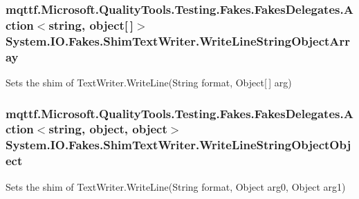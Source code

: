 \hypertarget{class_system_1_1_i_o_1_1_fakes_1_1_shim_text_writer_a5f06e2dba329e4cbc3cd29fa46e3e5e4}{
\subsubsection[{Write\-Line\-String\-Object\-Array}]{\setlength{\rightskip}{0pt plus 5cm}mqttf.\-Microsoft.\-Quality\-Tools.\-Testing.\-Fakes.\-Fakes\-Delegates.\-Action$<$string, object\mbox{[}$\,$\mbox{]}$>$ System.\-I\-O.\-Fakes.\-Shim\-Text\-Writer.\-Write\-Line\-String\-Object\-Array\hspace{0.3cm}{\ttfamily [set]}}}\label{class_system_1_1_i_o_1_1_fakes_1_1_shim_text_writer_a5f06e2dba329e4cbc3cd29fa46e3e5e4}


Sets the shim of Text\-Writer.\-Write\-Line(\-String format, Object\mbox{[}$\,$\mbox{]} arg)

\hypertarget{class_system_1_1_i_o_1_1_fakes_1_1_shim_text_writer_a6feb51fb3a382882016e29086e3f95c6}{
\subsubsection[{Write\-Line\-String\-Object\-Object}]{\setlength{\rightskip}{0pt plus 5cm}mqttf.\-Microsoft.\-Quality\-Tools.\-Testing.\-Fakes.\-Fakes\-Delegates.\-Action$<$string, object, object$>$ System.\-I\-O.\-Fakes.\-Shim\-Text\-Writer.\-Write\-Line\-String\-Object\-Object\hspace{0.3cm}{\ttfamily [set]}}}\label{class_system_1_1_i_o_1_1_fakes_1_1_shim_text_writer_a6feb51fb3a382882016e29086e3f95c6}


Sets the shim of Text\-Writer.\-Write\-Line(\-String format, Object arg0, Object arg1)


